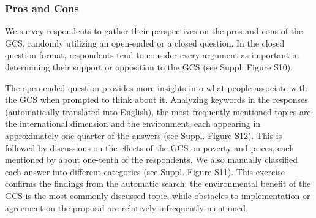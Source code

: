 \subsubsection{Pros and Cons}\label{subsubsec:pros_cons}

We survey respondents to gather their perspectives on the pros and cons of the GCS, randomly utilizing an open-ended or a closed question. In the closed question format, respondents tend to consider every argument as important in determining their support or opposition to the GCS (see Suppl. Figure S10). %

The open-ended question provides more insights into what people associate with the GCS when prompted to think about it. %
Analyzing keywords in the responses (automatically translated into English), the most frequently mentioned topics are the international dimension and the environment, each appearing in approximately one-quarter of the answers (see Suppl. Figure S12). %
This is followed by discussions on the effects of the GCS on poverty and prices, each mentioned by about one-tenth of the respondents. We also manually classified each answer into different categories (see Suppl. Figure S11). %
This exercise confirms the findings from the automatic search: the environmental benefit of the GCS is the most commonly discussed topic, while obstacles to implementation or agreement on the proposal are relatively infrequently mentioned.%

